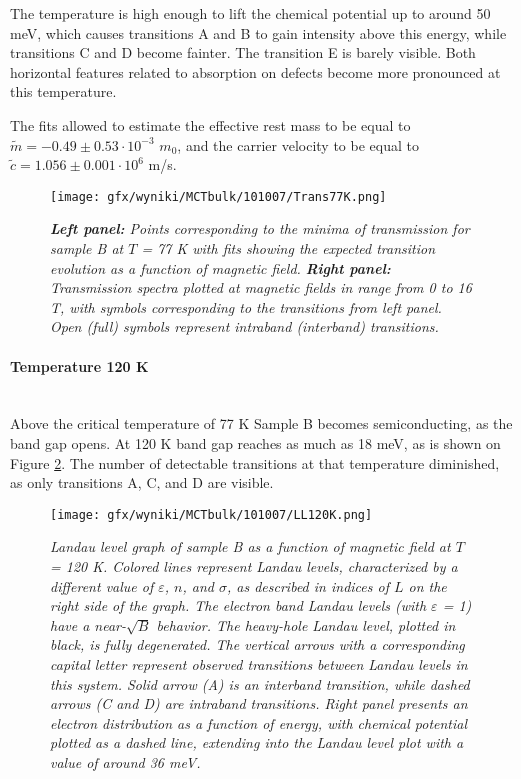 \documentclass[titlepage,a4paper]{book}
\newcommand{\wciecie}{\quad\phantom{v}}
\newcommand{\myparagraph}[1]{\paragraph{#1}\mbox{}\\}
\begin{document}
The temperature is high enough to lift the chemical potential up to around 50 meV, which causes transitions A and B to gain intensity above this energy, while transitions C and D become fainter. The transition E is barely visible. Both horizontal features related to absorption on defects become more pronounced at this temperature.

The fits allowed to estimate the effective rest mass to be equal to $\tilde m = -0.49 \pm 0.53 \cdot 10^{-3}$ $m_0$, and the carrier velocity to be equal to $\tilde{c} = 1.056 \pm 0.001 \cdot 10^6$ m/s.

\begin{figure}[ht]
	\centering
	\texttt{[image: gfx/wyniki/MCTbulk/101007/Trans77K.png]}
	\vspace{-10pt}
	\caption{\textit{\textbf{Left panel:} Points corresponding to the minima of transmission for sample B at $T$ = 77 K with fits showing the expected transition evolution as a function of magnetic field. \textbf{Right panel:} Transmission spectra plotted at magnetic fields in range from 0 to 16 T, with symbols corresponding to the transitions from left panel. Open (full) symbols represent intraband (interband) transitions.}}
	\label{fig:Spectra_101007_77K}
\end{figure}

\clearpage
\myparagraph{Temperature 120 K}
\wciecie
Above the critical temperature of 77 K Sample B becomes semiconducting, as the band gap opens. At 120 K band gap reaches as much as 18 meV, as is shown on Figure \ref{fig:LL_101007_120K}. The number of detectable transitions at that temperature diminished, as only transitions A, C, and D are visible.  
\begin{figure}[ht]
	\centering
	\texttt{[image: gfx/wyniki/MCTbulk/101007/LL120K.png]}
	\vspace{-10pt}
	\caption{\textit{Landau level graph of sample B as a function of magnetic field at $T$ = 120 K. Colored lines represent Landau levels, characterized by a different value of $\varepsilon$, $n$, and $\sigma$, as described in indices of $L$ on the right side of the graph. The electron band Landau levels (with $\varepsilon$ = 1) have a near-$\sqrt{B}$ behavior. The heavy-hole Landau level, plotted in black, is fully degenerated. The vertical arrows with a corresponding capital letter represent observed transitions between Landau levels in this system. Solid arrow (A) is an interband transition, while dashed arrows (C and D) are intraband transitions. Right panel presents an electron distribution as a function of energy, with chemical potential plotted as a dashed line, extending into the Landau level plot with a value of around 36 meV.}}
	\label{fig:LL_101007_120K}
\end{figure}
\end{document}
